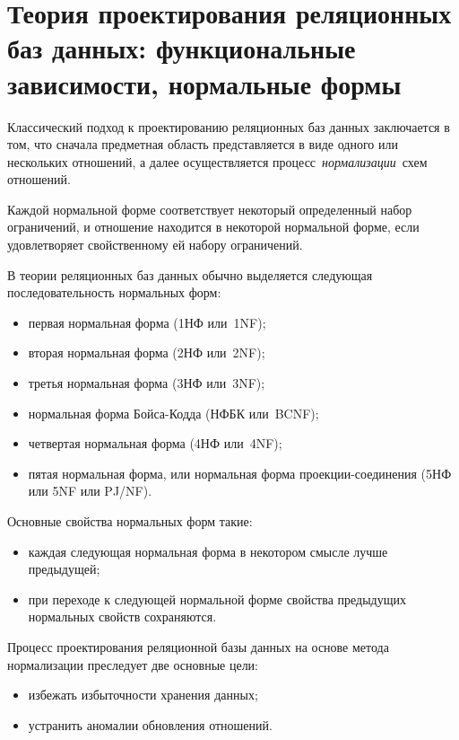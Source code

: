 \chapter{Теория проектирования реляционных баз данных: функциональные зависимости, нормальные формы}

Классический подход к проектированию реляционных баз данных заключается в том, что сначала предметная область представляется в виде одного или нескольких отношений, а далее осуществляется процесс \textit{нормализации} схем отношений.

Каждой нормальной форме соответствует некоторый определенный набор ограничений, и отношение находится в некоторой нормальной форме, если удовлетворяет свойственному ей набору ограничений. 

В теории реляционных баз данных обычно выделяется следующая последовательность нормальных форм:

\begin{itemize}[label*=--]
	\item первая нормальная форма (1НФ или 1NF);
	\item вторая нормальная форма (2НФ или 2NF);
	\item третья нормальная форма (3НФ или 3NF);
	\item нормальная форма Бойса-Кодда (НФБК или BCNF);
	\item четвертая нормальная форма (4НФ или 4NF);
	\item пятая нормальная форма, или нормальная форма проекции-соединения (5НФ или 5NF или PJ/NF).
\end{itemize}

Основные свойства нормальных форм такие:

\begin{itemize}[label*=--]
	\item каждая следующая нормальная форма в некотором смысле лучше предыдущей;
	\item при переходе к следующей нормальной форме свойства предыдущих нормальных свойств сохраняются.
\end{itemize}

\clearpage

Процесс проектирования реляционной базы данных на основе метода нормализации преследует две основные цели:

\begin{itemize}[label*=--]
	\item избежать избыточности хранения данных;
	\item устранить аномалии обновления отношений.
\end{itemize}


